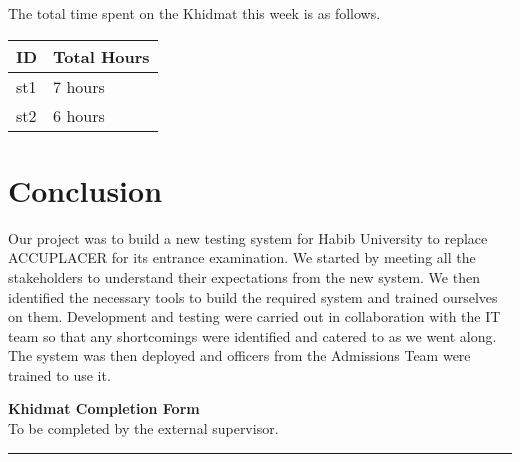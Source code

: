 \documentclass{article}
\begin{document}
The total time spent on the Khidmat this week is as follows.

\begin{tabular}{|l|l|}
  \hline
  ID  & Total Hours \\\hline\hline
  st1 & 7 hours     \\\hline
  st2 & 6 hours     \\\hline
\end{tabular}


\newpage
\section*{Conclusion}

Our project was to build a new testing system for Habib University to replace
ACCUPLACER for its entrance examination. We started by meeting all the
stakeholders to understand their expectations from the new system. We then
identified the necessary tools to build the required system and trained
ourselves on them. Development and testing were carried out in collaboration
with the IT team so that any shortcomings were identified and catered to as we
went along. The system was then deployed and officers from the Admissions Team
were trained to use it.

\newpage
\thispagestyle{empty}

\begin{center}
  {\Large\bf Khidmat Completion Form}\\[5pt]
  \small To be completed by the external supervisor.
\end{center}
\bigskip

\vfill

\begin{center}
  \rule{.8\textwidth}{.5pt}
\end{center}
\medskip

\end{document}
